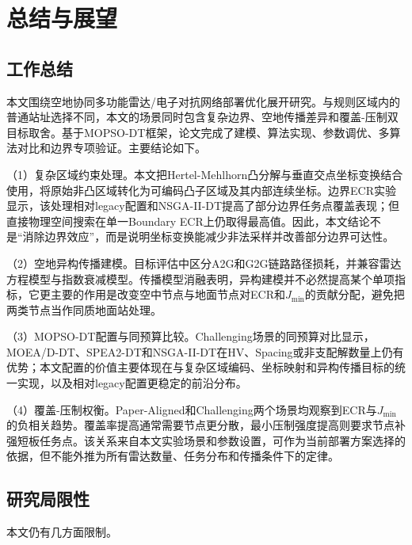 \chapter{总结与展望}\label{chap:conclusion}

\section{工作总结}

本文围绕空地协同多功能雷达/电子对抗网络部署优化展开研究。与规则区域内的普通站址选择不同，本文的场景同时包含复杂边界、空地传播差异和覆盖-压制双目标取舍。基于MOPSO-DT框架，论文完成了建模、算法实现、参数调优、多算法对比和边界专项验证。主要结论如下。

（1）复杂区域约束处理。本文把Hertel-Mehlhorn凸分解与垂直交点坐标变换结合使用，将原始非凸区域转化为可编码凸子区域及其内部连续坐标。边界ECR实验显示，该处理相对legacy配置和NSGA-II-DT提高了部分边界任务点覆盖表现；但直接物理空间搜索在单一Boundary ECR上仍取得最高值。因此，本文结论不是“消除边界效应”，而是说明坐标变换能减少非法采样并改善部分边界可达性。

（2）空地异构传播建模。目标评估中区分A2G和G2G链路路径损耗，并兼容雷达方程模型与指数衰减模型。传播模型消融表明，异构建模并不必然提高某个单项指标，它更主要的作用是改变空中节点与地面节点对ECR和$J_{\min}$的贡献分配，避免把两类节点当作同质地面站处理。

（3）MOPSO-DT配置与同预算比较。Challenging场景的同预算对比显示，MOEA/D-DT、SPEA2-DT和NSGA-II-DT在HV、Spacing或非支配解数量上仍有优势；本文配置的价值主要体现在与复杂区域编码、坐标映射和异构传播目标的统一实现，以及相对legacy配置更稳定的前沿分布。

（4）覆盖-压制权衡。Paper-Aligned和Challenging两个场景均观察到ECR与$J_{\min}$的负相关趋势。覆盖率提高通常需要节点更分散，最小压制强度提高则要求节点补强短板任务点。该关系来自本文实验场景和参数设置，可作为当前部署方案选择的依据，但不能外推为所有雷达数量、任务分布和传播条件下的定律。

\section{研究局限性}

本文仍有几方面限制。

